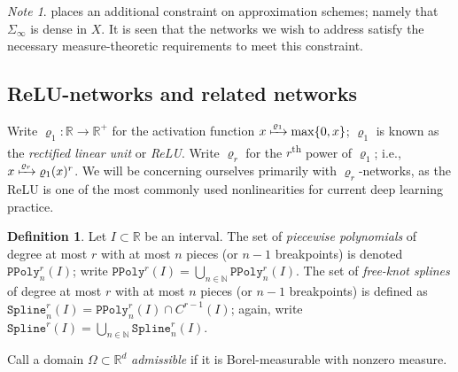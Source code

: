 \documentclass{article}
\theoremstyle{definition}
\newtheorem{definition}[theorem]{Definition}
\theoremstyle{remark}
\newtheorem*{note}{Note}
\begin{document}
\begin{note}
    \cite{gribonval_approximation_2022} places an additional constraint on approximation schemes; namely that $\Sigma_\infty$ is dense in $X$. It is seen that the networks we wish to address satisfy the necessary measure-theoretic requirements to meet this constraint.
\end{note}


\subsection{ReLU-networks and related networks}
Write $\varrho_1: \mathbb{R} \to \mathbb{R}^+$ for the activation function $x \xmapsto{\varrho_1} \max \{ 0,x \}$; $\varrho_1$ is known as the \textit{rectified linear unit} or \textit{ReLU}. Write $\varrho_r$ for the $r$\textsuperscript{th} power of $\varrho_1$; i.e., $x \xmapsto{\varrho_r} \varrho_1(x)^r$. We will be concerning ourselves primarily with $\varrho_r$-networks, as the ReLU is one of the most commonly used nonlinearities for current deep learning practice.

\begin{definition}
    Let $I \subset \mathbb{R}$ be an interval. The set of \textit{piecewise polynomials} of degree at most $r$ with at most $n$ pieces (or $n-1$ breakpoints) is denoted $\mathtt{PPoly}_n^r(I)$; write $\mathtt{PPoly}^r(I) = \bigcup_{n \in \mathbb{N}} \mathtt{PPoly}_n^r(I)$. The set of \textit{free-knot splines} of degree at most $r$ with at most $n$ pieces (or $n-1$ breakpoints) is defined as $\mathtt{Spline}_n^r(I) = \mathtt{PPoly}_n^r(I) \cap C^{r-1}(I)$; again, write $\mathtt{Spline}^r(I) = \bigcup_{n \in \mathbb{N}} \mathtt{Spline}_n^r(I)$.
\end{definition}

Call a domain $\Omega \subset \mathbb{R}^d$ \textit{admissible} if it is Borel-measurable with nonzero measure.
\end{document}
